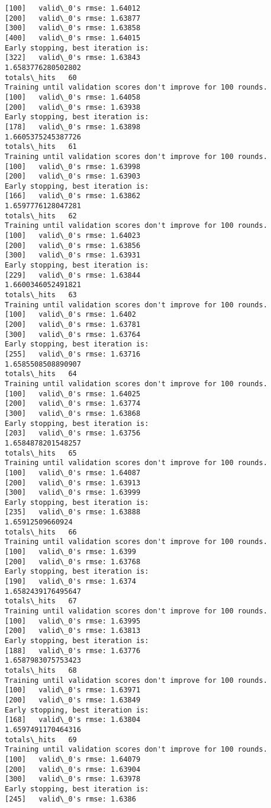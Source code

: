 \documentclass[11pt]{article}
\begin{document}
\begin{Verbatim}[commandchars=\\\{\}]
[100]	valid\_0's rmse: 1.64012
[200]	valid\_0's rmse: 1.63877
[300]	valid\_0's rmse: 1.63858
[400]	valid\_0's rmse: 1.64015
Early stopping, best iteration is:
[322]	valid\_0's rmse: 1.63843
1.6583776280502802
totals\_hits   60
Training until validation scores don't improve for 100 rounds.
[100]	valid\_0's rmse: 1.64058
[200]	valid\_0's rmse: 1.63938
Early stopping, best iteration is:
[178]	valid\_0's rmse: 1.63898
1.6605375245387726
totals\_hits   61
Training until validation scores don't improve for 100 rounds.
[100]	valid\_0's rmse: 1.63998
[200]	valid\_0's rmse: 1.63903
Early stopping, best iteration is:
[166]	valid\_0's rmse: 1.63862
1.6597776128047281
totals\_hits   62
Training until validation scores don't improve for 100 rounds.
[100]	valid\_0's rmse: 1.64023
[200]	valid\_0's rmse: 1.63856
[300]	valid\_0's rmse: 1.63931
Early stopping, best iteration is:
[229]	valid\_0's rmse: 1.63844
1.6600346052491821
totals\_hits   63
Training until validation scores don't improve for 100 rounds.
[100]	valid\_0's rmse: 1.6402
[200]	valid\_0's rmse: 1.63781
[300]	valid\_0's rmse: 1.63764
Early stopping, best iteration is:
[255]	valid\_0's rmse: 1.63716
1.6585508508890907
totals\_hits   64
Training until validation scores don't improve for 100 rounds.
[100]	valid\_0's rmse: 1.64025
[200]	valid\_0's rmse: 1.63774
[300]	valid\_0's rmse: 1.63868
Early stopping, best iteration is:
[203]	valid\_0's rmse: 1.63756
1.6584878201548257
totals\_hits   65
Training until validation scores don't improve for 100 rounds.
[100]	valid\_0's rmse: 1.64087
[200]	valid\_0's rmse: 1.63913
[300]	valid\_0's rmse: 1.63999
Early stopping, best iteration is:
[235]	valid\_0's rmse: 1.63888
1.65912509660924
totals\_hits   66
Training until validation scores don't improve for 100 rounds.
[100]	valid\_0's rmse: 1.6399
[200]	valid\_0's rmse: 1.63768
Early stopping, best iteration is:
[190]	valid\_0's rmse: 1.6374
1.6582439176495647
totals\_hits   67
Training until validation scores don't improve for 100 rounds.
[100]	valid\_0's rmse: 1.63995
[200]	valid\_0's rmse: 1.63813
Early stopping, best iteration is:
[188]	valid\_0's rmse: 1.63776
1.6587983075753423
totals\_hits   68
Training until validation scores don't improve for 100 rounds.
[100]	valid\_0's rmse: 1.63971
[200]	valid\_0's rmse: 1.63849
Early stopping, best iteration is:
[168]	valid\_0's rmse: 1.63804
1.6597491170464316
totals\_hits   69
Training until validation scores don't improve for 100 rounds.
[100]	valid\_0's rmse: 1.64079
[200]	valid\_0's rmse: 1.63904
[300]	valid\_0's rmse: 1.63978
Early stopping, best iteration is:
[245]	valid\_0's rmse: 1.6386

\end{Verbatim}
\end{document}
